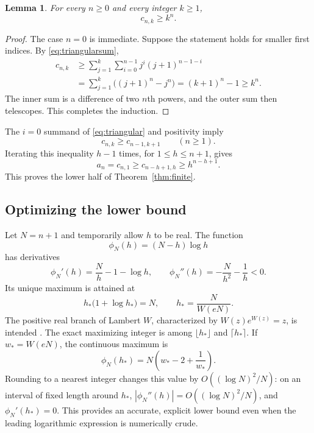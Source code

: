 \documentclass[11pt]{article}
\numberwithin{equation}{section}
\newtheorem{lemma}[theorem]{Lemma}
\theoremstyle{remark}
\begin{document}
\begin{lemma}\label{lem:powerlower}
For every $n\ge0$ and every integer $k\ge1$,
\begin{equation}\label{eq:powerlower}
 c_{n,k}\ge k^n.
\end{equation}
\end{lemma}
\begin{proof}
The case $n=0$ is immediate. Suppose the statement holds for smaller
first indices. By \eqref{eq:triangularsum},
\begin{align*}
 c_{n,k}
 &\ge\sum_{j=1}^k\sum_{i=0}^{n-1}j^i(j+1)^{n-1-i}\\
 &=\sum_{j=1}^k\bigl((j+1)^n-j^n\bigr)
  =(k+1)^n-1\ge k^n.
\end{align*}
The inner sum is a difference of two $n$th powers, and the outer sum
then telescopes. This completes the induction.
\end{proof}

The $i=0$ summand of \eqref{eq:triangular} and positivity imply
\[
 c_{n,k}\ge c_{n-1,k+1}\qquad(n\ge1).
\]
Iterating this inequality $h-1$ times, for $1\le h\le n+1$, gives
\begin{equation}\label{eq:pathlower}
 a_n=c_{n,1}\ge c_{n-h+1,h}\ge h^{n-h+1}.
\end{equation}
This proves the lower half of Theorem~\ref{thm:finite}.

\subsection{Optimizing the lower bound}

Let $N=n+1$ and temporarily allow $h$ to be real. The function
\[
 \phi_N(h)=(N-h)\log h
\]
has derivatives
\[
 \phi_N'(h)=\frac Nh-1-\log h,
 \qquad
 \phi_N''(h)=-\frac N{h^2}-\frac1h<0.
\]
Its unique maximum is attained at
\begin{equation}\label{eq:lowerW}
 h_*\bigl(1+\log h_*\bigr)=N,
 \qquad
 h_* =\frac{N}{W(eN)}.
\end{equation}
The positive real branch of Lambert $W$, characterized by
$W(z)e^{W(z)}=z$, is intended \cite{dlmf-w}. The exact maximizing integer
is among $\lfloor h_*\rfloor$ and $\lceil h_*\rceil$.
If $w_*=W(eN)$, the continuous maximum is
\begin{equation}\label{eq:lowerWvalue}
 \phi_N(h_*)=N\left(w_*-2+\frac1{w_*}\right).
\end{equation}
Rounding to a nearest integer changes this value by
$O((\log N)^2/N)$: on an interval of fixed length around $h_*$,
$|\phi_N''(h)|=O((\log N)^2/N)$, and $\phi_N'(h_*)=0$.
This provides an accurate, explicit lower bound even when the leading
logarithmic expression is numerically crude.
\end{document}
